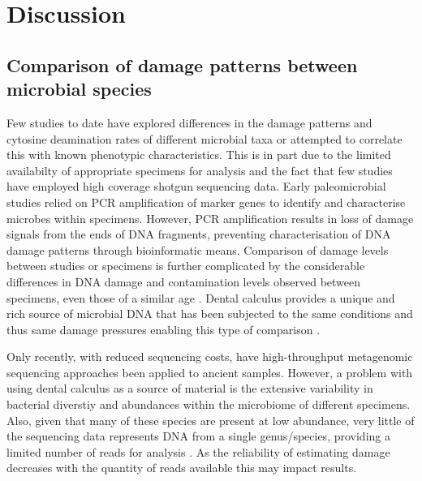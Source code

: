 \documentclass[12pt, a4paper]{article}
\begin{document}
\section{Discussion}\label{sec:discussion}

\subsection{Comparison of damage patterns between microbial species}

Few studies to date have explored differences in the damage patterns and cytosine deamination rates of different microbial taxa or attempted to correlate this with known phenotypic characteristics.
This is in part due to the limited availabilty of appropriate specimens for analysis and the fact that few studies have employed high coverage shotgun sequencing data.
Early paleomicrobial studies relied on PCR amplification of marker genes \cite{Spigelman:1993, Matheson:2009aa,Tito:2012aa, Adler:2013aa} to identify and characterise microbes within specimens.
However, PCR amplification results in loss of damage signals from the ends of DNA fragments, preventing characterisation of DNA damage patterns through bioinformatic means.
Comparison of damage levels between studies or specimens is further complicated by the considerable differences in DNA damage and contamination levels observed between specimens, even those of a similar age \cite{Allentoft:2012aa}.
Dental calculus provides a unique and rich source of microbial DNA that has been subjected to the same conditions and thus same damage pressures enabling this type of comparison \cite{Ziesemer:2015aa, Weyrich:2017aa}.

Only recently, with reduced sequencing costs, have high-throughput metagenomic sequencing approaches been applied to ancient samples.
However, a problem with using dental calculus as a source of material is the extensive variability in bacterial diverstiy and abundances within the microbiome of different specimens. 
Also, given that many of these species are present at low abundance, very little of the sequencing data represents DNA from a single genus/species, providing a limited number of reads for analysis \cite{Weyrich:2017aa,Warinner:2014aa,Ziesemer:2015aa}. 
As the reliability of estimating damage decreases with the quantity of reads available this may impact results. %
\end{document}
